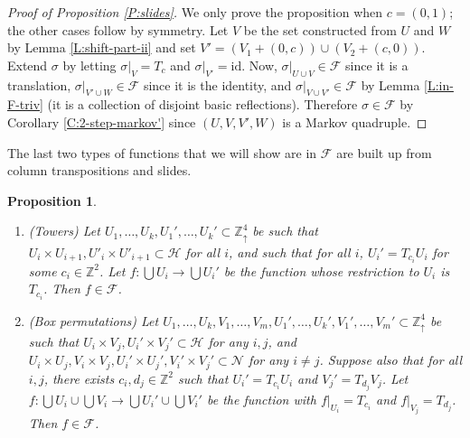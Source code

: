 \documentclass[aop, preprint]{imsart}
\theoremstyle{plain}
\newtheorem{prop}[theorem]{Proposition}%
\theoremstyle{definition}
\theoremstyle{plain}
\newcommand{\sset}{\subset}
\newcommand{\sig}{\sigma}
\newcommand{\Zd}{\mathds{Z}^4_\uparrow}
\newcommand{\scrH}{\mathcal{H}}
\newcommand{\scrN}{\mathcal{N}}
\newcommand{\scrF}{\mathcal{F}}
\newcommand{\Z}{\mathds{Z}}
\newcommand{\X}{\times}
\newcommand{\id}{\text{id}}
\begin{document}
\begin{proof}[Proof of Proposition \ref{P:slides}]
	We only prove the proposition when $c = (0, 1)$; the other cases follow by symmetry. Let $V$ be the set constructed from $U$ and $W$ by Lemma \ref{L:shift-part-ii} and set $V' = (V_1 + (0, c)) \cup (V_2 + (c, 0))$. Extend $\sig$ by letting $\sig|_V = T_c$ and $\sig|_{V'} = \id$. Now, $\sig|_{U \cup V} \in \scrF$ since it is a translation, $\sig|_{V' \cup W} \in \scrF$ since it is the identity, and $\sig|_{V \cup V'} \in \scrF$ by Lemma \ref{L:in-F-triv} (it is a collection of disjoint basic reflections). Therefore $\sig \in \scrF$ by Corollary \ref{C:2-step-markov'} since $(U, V, V', W)$ is a Markov quadruple.
\end{proof}

The last two types of functions that we will show are in $\scrF$ are built up from column transpositions and slides.


\begin{prop}
	\label{P:lie-in-F}
	\begin{enumerate}
		\item (Towers) Let $U_1, \dots, U_k, U_1', \dots, U_k' \sset \Zd$ be such that $U_i \X U_{i+1}, U'_i \X U'_{i+1} \sset \scrH$ for all $i$, and such that for all $i$, $U_i' = T_{c_i} U_i$ for some $c_i \in \Z^2$. Let $f:\bigcup U_i \to \bigcup U_i'$ be the function whose restriction to $U_i$ is $T_{c_i}$. Then $f \in \scrF$. 
		\item (Box permutations) Let $U_1, \dots, U_k, V_1, \dots, V_m, U_1', \dots, U_k', V_1', \dots, V_m' \sset \Zd$ be such that $U_i \X V_j, U_i' \X V_j' \sset \scrH$ for any $i, j$, and $U_i \X U_j, V_i \X V_j, U_i' \X U_j', V_i' \X V_j' \sset \scrN$ for any $i \ne j$. Suppose also that for all $i, j$, there exists $c_i, d_j \in \Z^2$ such that $U_i' = T_{c_i} U_i$ and $V_j' = T_{d_j} V_j$. Let $f:\bigcup U_i \cup \bigcup V_i \to \bigcup U_i' \cup \bigcup V_i'$ be the function with $f|_{U_i} = T_{c_i}$ and $f|_{V_j} = T_{d_j}$. Then $f \in \scrF$.
	\end{enumerate}
\end{prop}
\end{document}
